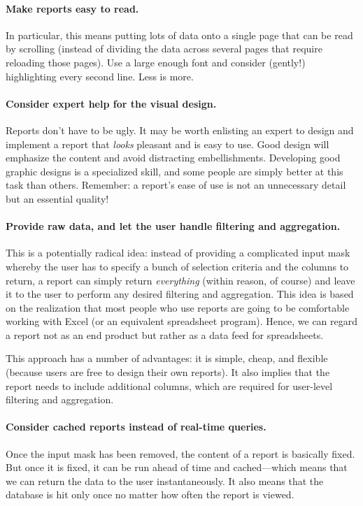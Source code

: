 \paragraph{Make reports easy to read.}
In particular, this means putting lots of data onto a single page that
can be read by scrolling (instead of dividing the data across several
pages that require reloading those pages).  Use a large enough font
and consider (gently!) highlighting every second line. Less is more.

\paragraph{Consider expert help for the visual design.}
Reports don't have to be ugly.  It may be worth enlisting an expert to
design and implement a report that \emph{looks} pleasant and is easy
to use. Good design will emphasize the content and avoid distracting
embellishments.  Developing good graphic designs is a specialized
skill, and some people are simply better at this task than others.
Remember: a report's ease of use is not an unnecessary detail but an
essential quality!\vfill\pagebreak

\paragraph{Provide raw data, and let the user handle filtering and
aggregation.} This is a potentially radical idea: instead of providing a
complicated input mask whereby the user has to specify a bunch of selection
criteria and the columns to return, a report can simply return
\emph{everything} (within reason, of course) and leave it to the user
to perform any desired filtering and aggregation.  This idea is based
on the realization that most people who use reports are going to be
comfortable working with Excel (or an equivalent spreadsheet program).
Hence, we can regard a report not as an end product but rather as a
data feed for spreadsheets.

This approach has a number of advantages: it is simple, cheap, and
flexible (because users are free to design their own reports). It also
implies that the report needs to include additional columns, which are
required for user-level filtering and aggregation.

\paragraph{Consider cached reports instead of real-time queries.}
Once the input mask has been removed, the content of a report is
basically fixed. But once it is fixed, it can be run ahead of time and
cached---which means that we can return the data to the user
instantaneously. It also means that the database is hit only once no
matter how often the report is viewed.

